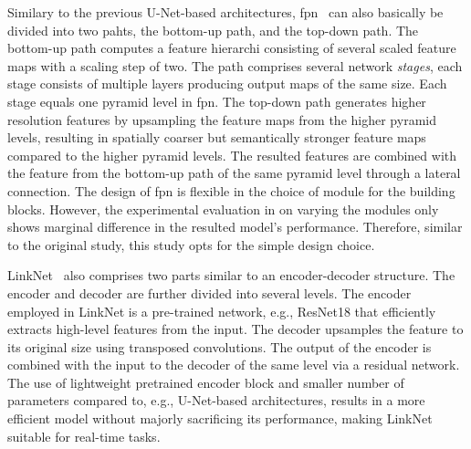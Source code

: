 \documentclass[mathematics,article,submit,pdftex,moreauthors]{Definitions/mdpi}
\begin{document}
Similary to the previous U-Net-based architectures,
\ac{fpn}~\cite{Lin2017} can also basically 
be divided into two pahts, the bottom-up path,
and the top-down path. The bottom-up
path computes a feature hierarchi consisting
of several scaled feature maps with a scaling
step of two. The path comprises several network
\textit{stages}, each stage consists of multiple layers
producing output maps of the same size.
Each stage equals one pyramid level in \ac{fpn}.
The top-down path generates higher resolution
features by upsampling the feature maps from
the higher pyramid levels, resulting
in spatially coarser but semantically stronger feature maps
compared to the higher pyramid levels.
The resulted features are combined with
the feature from the bottom-up
path of the same pyramid level through a lateral
connection. The design of \ac{fpn}
is flexible in the choice of module
for the building blocks.
However, the experimental evaluation in 
\cite{Lin2017} on varying the modules only
shows marginal difference in the resulted model's
performance. Therefore, similar to the original study,
this study opts for the simple design choice.

LinkNet~\cite{Chaurasia2017} also comprises two parts similar
to an encoder-decoder structure. 
The encoder and decoder are further
divided into several levels.
The encoder employed in LinkNet is a pre-trained
network, e.g., ResNet18 that
efficiently extracts high-level features from
the input. The decoder upsamples the feature
to its original size using transposed
convolutions. The output of the
encoder is combined with the input
to the decoder of the same level via
a residual network. The use of lightweight
pretrained encoder block and smaller
number of parameters compared to, e.g., 
U-Net-based architectures, results 
in a more efficient model without
majorly sacrificing its performance,
making LinkNet suitable for real-time
tasks.
\end{document}
